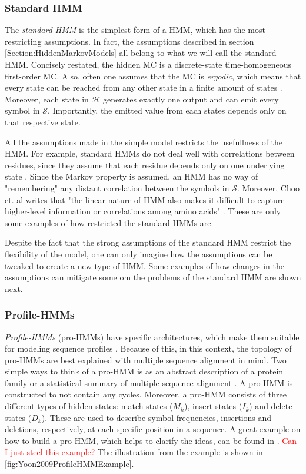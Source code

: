 \documentclass{article}
\begin{document}
\subsubsection{Standard HMM}
The \textit{standard HMM} is the simplest form of a HMM, which has the most restricting assumptions. In fact, the assumptions described in section \ref{Section:HiddenMarkovModels} all belong to what we will call the standard HMM. Concisely restated, the hidden MC is a discrete-state time-homogeneous first-order MC. Also, often one assumes that the MC is \textit{ergodic}, which means that every state can be reached from any other state in a finite amount of states \cite{Rabiner1989}. Moreover, each state in $\mathcal{H}$ generates exactly one output and can emit every symbol in $\mathcal{S}$. Importantly, the emitted value from each states depends only on that respective state. 

All the assumptions made in the simple model restricts the usefullness of the HMM. For example, standard HMMs do not deal well with correlations between residues, since they assume that each residue depends only on one underlying state \cite{Eddy04}. Since the Markov property is assumed, an HMM has no way of "remembering" any distant correlation between the symbols in $\mathcal{S}$. Moreover, Choo et. al writes that "the linear nature of HMM also makes it difficult to capture higher-level information or correlations among amino acids" \cite{Choo2004}. These are only some examples of how restricted the standard HMMs are. 

Despite the fact that the strong assumptions of the standard HMM restrict the flexibility of the model, one can only imagine how the assumptions can be tweaked to create a new type of HMM. Some examples of how changes in the assumptions can mitigate some om the problems of the standard HMM are shown next.  

\subsubsection{Profile-HMMs}
\textit{Profile-HMMs} (pro-HMMs) have specific architectures, which make them suitable for modeling sequence profiles \cite{Yoon2009}. Because of this, in this context, the topology of pro-HMMs are best explained with multiple sequence alignment in mind. Two simple ways to think of a pro-HMM is as an abstract description of a protein family or a statistical summary of multiple sequence alignment \cite{Christianini2006}. A pro-HMM is constructed to not contain any cycles. Moreover, a pro-HMM consists of three different types of hidden states: match states ($M_k$), insert states ($I_k$) and delete states ($D_k$). These are used to describe symbol frequencies, insertions and deletions, respectively, at each specific position in a sequence. A great example on how to build a pro-HMM, which helps to clarify the ideas, can be found in \cite{Yoon2009}. \textcolor{red}{Can I just steel this example?} The illustration from the example is shown in \ref{fig:Yoon2009ProfileHMMExample}.
\end{document}
